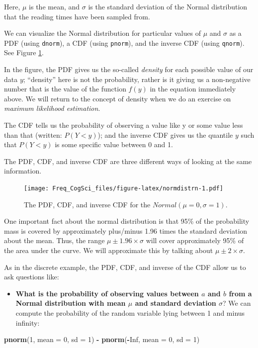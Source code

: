 \documentclass[12pt,]{krantz}
\newenvironment{Shaded}{\begin{snugshade}}{\end{snugshade}}
\newcommand{\DataTypeTok}[1]{\textcolor[rgb]{0.13,0.29,0.53}{#1}}
\newcommand{\DecValTok}[1]{\textcolor[rgb]{0.00,0.00,0.81}{#1}}
\newcommand{\KeywordTok}[1]{\textcolor[rgb]{0.13,0.29,0.53}{\textbf{#1}}}
\newcommand{\NormalTok}[1]{#1}
\newcommand{\OperatorTok}[1]{\textcolor[rgb]{0.81,0.36,0.00}{\textbf{#1}}}
\newcommand{\OtherTok}[1]{\textcolor[rgb]{0.56,0.35,0.01}{#1}}
\newcommand{\StringTok}[1]{\textcolor[rgb]{0.31,0.60,0.02}{#1}}
\providecommand{\tightlist}{%
  \setlength{\itemsep}{0pt}\setlength{\parskip}{0pt}}
\begin{document}
Here, \(\mu\) is the mean, and \(\sigma\) is the standard deviation of the Normal distribution that the reading times have been sampled from.

We can visualize the Normal distribution for particular values of \(\mu\) and \(\sigma\) as a PDF (using \texttt{dnorm}), a CDF (using \texttt{pnorm}), and the inverse CDF (using \texttt{qnorm}). See Figure \ref{fig:normdistrn}.

In the figure, the PDF gives us the so-called \emph{density} for each possible value of our data \(y\); ``density'' here is not the probability, rather is it giving us a non-negative number that is the value of the function \(f(y)\) in the equation immediately above. We will return to the concept of density when we do an exercise on \emph{maximum likelihood estimation}.

The CDF tells us the probability of observing a value like y or some value less than that (written: \(P(Y<y)\)); and the inverse CDF gives us the quantile \(y\) such that \(P(Y<y)\) is some specific value between 0 and 1.

The PDF, CDF, and inverse CDF are three different ways of looking at the same information.

\begin{figure}
\centering
\texttt{[image: Freq\_CogSci\_files/figure-latex/normdistrn-1.pdf]}
\caption{\label{fig:normdistrn}The PDF, CDF, and inverse CDF for the \(Normal(\mu=0,\sigma=1)\).}
\end{figure}

One important fact about the normal distribution is that 95\% of the probability mass is covered by approximately plus/minus 1.96 times the standard deviation about the mean. Thus, the range \(\mu\pm 1.96\times \sigma\) will cover approximately 95\% of the area under the curve. We will approximate this by talking about \(\mu\pm 2\times \sigma\).

As in the discrete example, the PDF, CDF, and inverse of the CDF allow us to ask questions like:

\begin{itemize}
\tightlist
\item
  \textbf{What is the probability of observing values between \(a\) and \(b\) from a Normal distribution with mean \(\mu\) and standard deviation \(\sigma\)}? We can compute the probability of the random variable lying between 1 and minus infinity:
\end{itemize}

\begin{Shaded}
\begin{Highlighting}[]
\KeywordTok{pnorm}\NormalTok{(}\DecValTok{1}\NormalTok{, }\DataTypeTok{mean =} \DecValTok{0}\NormalTok{, }\DataTypeTok{sd =} \DecValTok{1}\NormalTok{) }\OperatorTok{-}\StringTok{ }\KeywordTok{pnorm}\NormalTok{(}\OperatorTok{-}\OtherTok{Inf}\NormalTok{, }\DataTypeTok{mean =} \DecValTok{0}\NormalTok{, }
  \DataTypeTok{sd =} \DecValTok{1}\NormalTok{)}
\end{Highlighting}
\end{Shaded}
\end{document}
